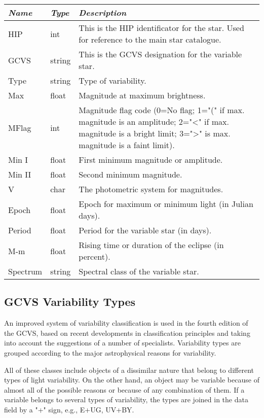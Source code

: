 \begin{longtabu} to \textwidth {l|l|X}\toprule
\emph{Name} & \emph{Type} & \emph{Description}\\\midrule
HIP      & int    & This is the HIP identificator for the star. Used for reference to the main star catalogue.\\\midrule
GCVS     & string & This is the GCVS designation for the variable star.\\\midrule
Type     & string & Type of variability.\\\midrule
Max      & float  & Magnitude at maximum brightness.\\\midrule
MFlag    & int    & Magnitude flag code (0=No flag; 1="(" if max. magnitude is an amplitude; 
                    2="\textless{}" if max. magnitude is a bright limit; 
                    3="\textgreater{}" is max. magnitude is a faint limit).\\\midrule
Min I    & float  & First minimum magnitude or amplitude.\\\midrule
Min II   & float  & Second minimum magnitude.\\\midrule
V        & char   & The photometric system for magnitudes.\\\midrule
Epoch    & float  & Epoch for maximum or minimum light (in Julian days).\\\midrule
Period   & float  & Period for the variable star (in days).\\\midrule
M-m      & float  & Rising time or duration of the eclipse (in percent).\\\midrule
Spectrum & string & Spectral class of the variable star.\\\bottomrule
\end{longtabu}

\subsection{GCVS Variability Types}\label{gcvs-variability-types}

An improved system of variability classification is used in the fourth
edition of the GCVS, based on recent developments in classification
principles and taking into account the suggestions of a number of
specialists. Variability types are grouped according to the major
astrophysical reasons for variability.

All of these classes include objects of a dissimilar nature that belong
to different types of light variability. On the other hand, an object
may be variable because of almost all of the possible reasons or because
of any combination of them. If a variable belongs to several types of
variability, the types are joined in the data field by a "+" sign, e.g.,
E+UG, UV+BY.


